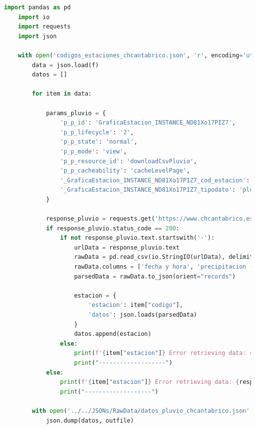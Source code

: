 \begin{lstlisting}[language=Python, caption={Script de obtención de datos pluviometricos descartado}]
	import pandas as pd
	import io
	import requests
	import json
	
	with open('codigos_estaciones_chcantabrico.json', 'r', encoding='utf-8') as f:
		data = json.load(f)
		datos = []
		
		for item in data:

			params_pluvio = {
				'p_p_id': 'GraficaEstacion_INSTANCE_ND81Xo17PIZ7',
				'p_p_lifecycle': '2',
				'p_p_state': 'normal',
				'p_p_mode': 'view',
				'p_p_resource_id': 'downloadCsvPluvio',
				'p_p_cacheability': 'cacheLevelPage',
				'_GraficaEstacion_INSTANCE_ND81Xo17PIZ7_cod_estacion': f'{item["codigo"]}',
				'_GraficaEstacion_INSTANCE_ND81Xo17PIZ7_tipodato': 'pluvio',
			}
			
			response_pluvio = requests.get('https://www.chcantabrico.es/precipitacion-acumulada', params=params_pluvio)
			if response_pluvio.status_code == 200:
				if not response_pluvio.text.startswith('-'):
					urlData = response_pluvio.text
					rawData = pd.read_csv(io.StringIO(urlData), delimiter=';', encoding='utf-8', header=1)
					rawData.columns = ['fecha y hora', 'precipitacion (mm)']
					parsedData = rawData.to_json(orient="records")
					
					estacion = {
						'estacion': item["codigo"],
						'datos': json.loads(parsedData)
					}
					datos.append(estacion)
				else:
					print(f'{item["estacion"]} Error retrieving data: 404')
					print("-------------------")
			else:
				print(f'{item["estacion"]} Error retrieving data: {response_pluvio.status_code}')
				print("-------------------")
		
		with open('../../JSONs/RawData/datos_pluvio_chcantabrico.json', 'w', encoding='utf-8') as outfile:
			json.dump(datos, outfile)
\end{lstlisting}

